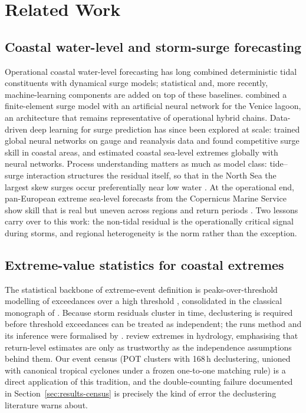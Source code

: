 \section{Related Work}
\label{sec:related}

\subsection{Coastal water-level and storm-surge forecasting}
Operational coastal water-level forecasting has long combined deterministic
tidal constituents with dynamical surge models; statistical and, more
recently, machine-learning components are added on top of these baselines.
\citet{bajo2010storm} combined a finite-element surge model with an artificial
neural network for the Venice lagoon, an architecture that remains
representative of operational hybrid chains. Data-driven deep learning for
surge prediction has since been explored at scale: \citet{tiggeloven2021exploring}
trained global neural networks on gauge and reanalysis data and found
competitive surge skill in coastal areas, and \citet{bruneau2020estimation}
estimated coastal sea-level extremes globally with neural networks.
Process understanding matters as much as model class: tide--surge interaction
structures the residual itself, so that in the North Sea the largest skew
surges occur preferentially near low water \citep{horsburgh2007tidesurge}.
At the operational end, pan-European extreme sea-level forecasts from the
Copernicus Marine Service show skill that is real but uneven across regions
and return periods \citep{irazoqui2022towards}. Two lessons carry over to this
work: the non-tidal residual is the operationally critical signal during
storms, and regional heterogeneity is the norm rather than the exception.

\subsection{Extreme-value statistics for coastal extremes}
The statistical backbone of extreme-event definition is peaks-over-threshold
modelling of exceedances over a high threshold \citep{davison1990models},
consolidated in the classical monograph of \citet{coles2001introduction}.
Because storm residuals cluster in time, declustering is required before
threshold exceedances can be treated as independent; the runs method and its
inference were formalised by \citet{ferro2003inference}. \citet{katz2002statistics}
review extremes in hydrology, emphasising that return-level estimates are only
as trustworthy as the independence assumptions behind them. Our event census
(POT clusters with 168\,h declustering, unioned with canonical tropical
cyclones under a frozen one-to-one matching rule) is a direct application of
this tradition, and the double-counting failure documented in
Section~\ref{sec:results-census} is precisely the kind of error the
declustering literature warns about.


